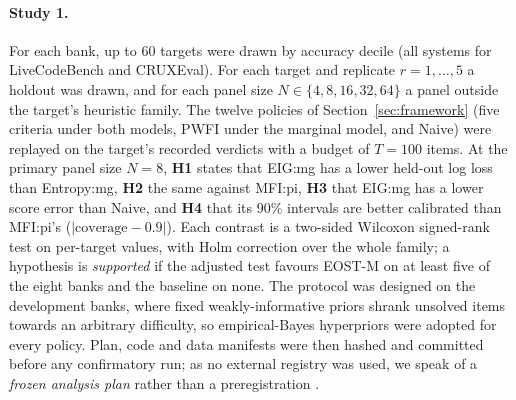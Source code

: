 \paragraph{Study 1.} For each bank, up to 60 targets were drawn by accuracy decile (all
systems for LiveCodeBench and CRUXEval). For each target and replicate $r=1,\dots,5$ a
holdout was drawn, and for each panel size $N\in\{4,8,16,32,64\}$ a panel outside the
target's heuristic family. The twelve policies of Section~\ref{sec:framework} (five criteria
under both models, PWFI under the marginal model, and Naive) were replayed on the target's
recorded verdicts with a budget of $T=100$ items. At the primary panel size $N=8$,
\textbf{H1} states that EIG:mg has a lower held-out log loss than Entropy:mg, \textbf{H2}
the same against MFI:pi, \textbf{H3} that EIG:mg has a lower score error than Naive, and
\textbf{H4} that its 90\% intervals are better calibrated than MFI:pi's
($|\mathrm{coverage}-0.9|$). Each contrast is a two-sided Wilcoxon signed-rank test
\citep{wilcoxon1945individual} on per-target values, with Holm correction
\citep{holm1979simple} over the whole family; a hypothesis is \emph{supported} if the
adjusted test favours EOST-M on at least five of the eight banks and the baseline on none.
The protocol was designed on the development banks, where fixed weakly-informative priors
shrank unsolved items towards an arbitrary difficulty, so empirical-Bayes hyperpriors were
adopted for every policy. Plan, code and data manifests were then hashed and committed
before any confirmatory run; as no external registry was used, we speak of a \emph{frozen
analysis plan} rather than a preregistration \citep{nosek2018preregistration}.

